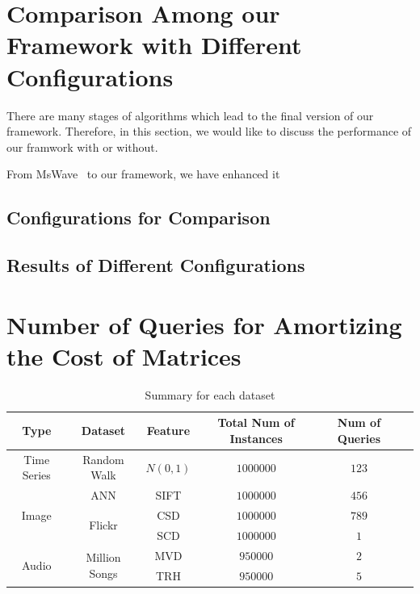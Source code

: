 


\section{Comparison Among our Framework with Different Configurations} %
\label{s:comparison_among_our_framework_with_different_configurations}

There are many stages of algorithms which lead to the final version of our framework.  Therefore, in this section, we would like to discuss the performance of our framwork with or without.

From MsWave~\cite{MsWave} to our framework, we have enhanced it


\subsection{Configurations for Comparison} %
\label{sub:configurations_for_comparison}





\subsection{Results of Different Configurations} %
\label{sub:results_of_different_configurations}








\section{Number of Queries for Amortizing the Cost of Matrices} %
\label{s:number_of_queries_for_amortizing_the_cost_of_matrices}

\begin{table}[htpb]\begin{center}
\caption{Summary for each dataset}\label{table:datasets}
\begin{tabular}{|c|c|c|c|c|c|}
\hline 
Type & Dataset & Feature & Total Num of Instances & Num of Queries\\ \hline \hline
Time Series & Random Walk & $N(0,1)$ & $1000000$ & $123$\\ \hline
\multirow{3}{*}{Image} & ANN & SIFT & $1000000$ & $456$\\ 
\cline{2-5}
 & \multirow{2}{*}{Flickr} & CSD & $1000000$ & $789$\\ 
 \cline{3-5}
 & & SCD &  $1000000$ & $1$\\ \hline
 \multirow{2}{*}{Audio} & \multirow{2}{*}{Million Songs} & MVD & $950000$ & $2$\\ 
 \cline{3-5}
 & & TRH & $950000$ & $5$\\ \hline
\end{tabular}
\end{center}\end{table}



